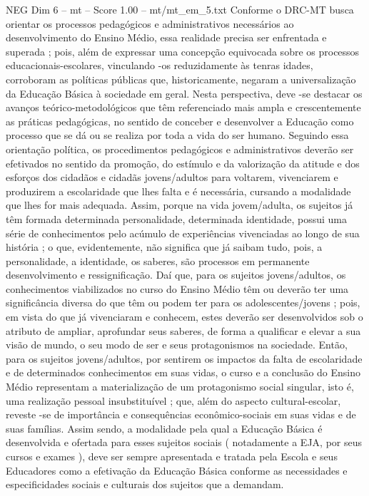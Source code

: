 \begin{textsample}{NEG Dim 6 – mt – Score 1.00 – mt/mt\_em\_5.txt}
Conforme o DRC-MT busca orientar os processos pedagógicos e administrativos necessários ao desenvolvimento do Ensino Médio, essa realidade precisa ser enfrentada e superada ; pois, além de expressar uma concepção equivocada sobre os processos educacionais-escolares, vinculando -os reduzidamente às tenras idades, corroboram as políticas públicas que, historicamente, negaram a universalização da Educação Básica à sociedade em geral.
Nesta perspectiva, deve -se destacar os avanços teórico-metodológicos que têm referenciado mais ampla e crescentemente as práticas pedagógicas, no sentido de conceber e desenvolver a Educação como processo que se dá ou se realiza por toda a vida do ser humano.
Seguindo essa orientação política, os procedimentos pedagógicos e administrativos deverão ser efetivados no sentido da promoção, do estímulo e da valorização da atitude e dos esforços dos cidadãos e cidadãs jovens/adultos para voltarem, vivenciarem e produzirem a escolaridade que lhes falta e é necessária, cursando a modalidade que lhes for mais adequada.
Assim, porque na vida jovem/adulta, os sujeitos já têm formada determinada personalidade, determinada identidade, possui uma série de conhecimentos pelo acúmulo de experiências vivenciadas ao longo de sua história ; o que, evidentemente, não significa que já saibam tudo, pois, a personalidade, a identidade, os saberes, são processos em permanente desenvolvimento e ressignificação.
Daí que, para os sujeitos jovens/adultos, os conhecimentos viabilizados no curso do Ensino Médio têm ou deverão ter uma significância diversa do que têm ou podem ter para os adolescentes/jovens ; pois, em vista do que já vivenciaram e conhecem, estes deverão ser desenvolvidos sob o atributo de ampliar, aprofundar seus saberes, de forma a qualificar e elevar a sua visão de mundo, o seu modo de ser e seus protagonismos na sociedade.
Então, para os sujeitos jovens/adultos, por sentirem os impactos da falta de escolaridade e de determinados conhecimentos em suas vidas, o curso e a conclusão do Ensino Médio representam a materialização de um protagonismo social singular, isto é, uma realização pessoal insubstituível ; que, além do aspecto cultural-escolar, reveste -se de importância e consequências econômico-sociais em suas vidas e de suas famílias.
Assim sendo, a modalidade pela qual a Educação Básica é desenvolvida e ofertada para esses sujeitos sociais ( notadamente a EJA, por seus cursos e exames ), deve ser sempre apresentada e tratada pela Escola e seus Educadores como a efetivação da Educação Básica conforme as necessidades e especificidades sociais e culturais dos sujeitos que a demandam.

\end{textsample}
